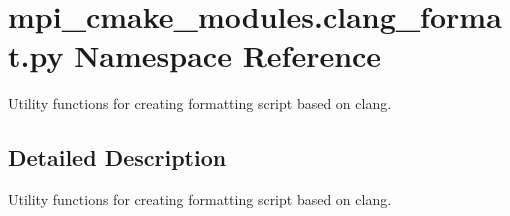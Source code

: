 \hypertarget{namespacempi__cmake__modules_1_1clang__format_1_1py}{}\section{mpi\+\_\+cmake\+\_\+modules.\+clang\+\_\+format.\+py Namespace Reference}
\label{namespacempi__cmake__modules_1_1clang__format_1_1py}


Utility functions for creating formatting script based on clang.  




\subsection{Detailed Description}
Utility functions for creating formatting script based on clang. 